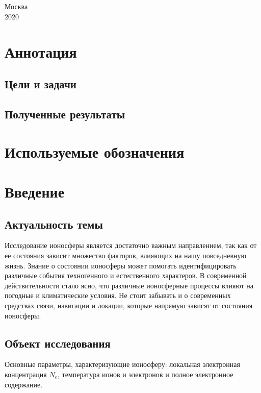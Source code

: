 \documentclass[14pt,eqno, fontsize=14pt]{article}
\begin{document}
~\

~\

~\

~\

\begin{center}
\small
Москва\\
2020
\end{center}

\newpage
\section*{Аннотация}
\subsection*{Цели и задачи}

\subsection*{Полученные результаты}

\newpage
\tableofcontents

\newpage
\section*{Используемые обозначения}

\newpage
\section*{Введение}
\subsection*{Актуальность темы}
Исследование ионосферы является достаточно важным направлением, так как от ее состояния зависит множество факторов, влияющих на нашу повседневную жизнь. Знание о состоянии ионосферы может помогать идентифицировать различные события техногенного и естественного характеров. В современной действительности стало ясно, что различные ионосферные процессы влияют на погодные и климатические условия. Не стоит забывать и о современных средствах связи, навигации и локации, которые напрямую зависят от состояния ионосферы.

\subsection*{Объект исследования}
Основные параметры, характеризующие ионосферу: локальная электронная концентрация $N_e$, температура ионов и электронов и полное электронное содержание.
\end{document}
